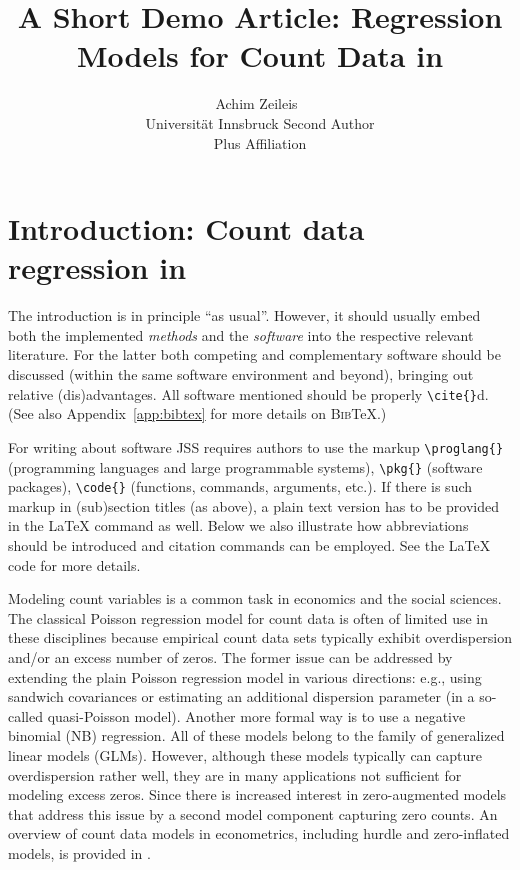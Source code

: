 \documentclass[article]{jss}
\author{Achim Zeileis~\orcidlink{0000-0003-0918-3766}\\Universit\"at Innsbruck
   \And Second Author\\Plus Affiliation}
\title{A Short Demo Article: Regression Models for Count Data in \proglang{R}}
\begin{document}


\section[Introduction: Count data regression in R]{Introduction: Count data regression in } \label{sec:intro}

\begin{leftbar}
The introduction is in principle ``as usual''. However, it should usually embed
both the implemented \emph{methods} and the \emph{software} into the respective
relevant literature. For the latter both competing and complementary software
should be discussed (within the same software environment and beyond), bringing
out relative (dis)advantages. All software mentioned should be properly
\verb|\cite{}|d. (See also Appendix~\ref{app:bibtex} for more details on
\textsc{Bib}{\TeX}.)

For writing about software JSS requires authors to use the markup
\verb|\proglang{}| (programming languages and large programmable systems),
\verb|\pkg{}| (software packages), \verb|\code{}| (functions, commands,
arguments, etc.). If there is such markup in (sub)section titles (as above), a
plain text version has to be provided in the {\LaTeX} command as well. Below we
also illustrate how abbreviations should be introduced and citation commands can
be employed. See the {\LaTeX} code for more details.
\end{leftbar}

Modeling count variables is a common task in economics and the social sciences.
The classical Poisson regression model for count data is often of limited use in
these disciplines because empirical count data sets typically exhibit
overdispersion and/or an excess number of zeros. The former issue can be
addressed by extending  the plain Poisson regression model in various
directions: e.g., using sandwich covariances or estimating an additional
dispersion parameter (in a so-called quasi-Poisson model). Another more formal
way is to use a negative binomial (NB) regression. All of these models belong to
the family of generalized linear models (GLMs). However, although these models
typically can capture overdispersion rather well, they are in many applications
not sufficient for  modeling excess zeros. Since \cite{Mullahy:1986} there is
increased interest in zero-augmented models that address this issue by a second
model component capturing zero counts. An overview of count data models in
econometrics, including  hurdle and zero-inflated models, is provided in
\cite{Cameron+Trivedi:2013}.
\end{document}
